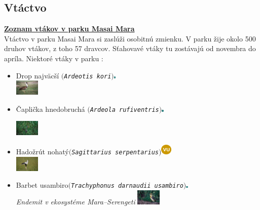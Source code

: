 \documentclass{article}
\begin{document}
	\subsection{Vtáctvo}
\href{https://raw.githubusercontent.com/jenca-adam/masai-mara-birding/master/vtactvo.txt}{\textbf{Zoznam vtákov v parku Masai Mara}}\\ 
Vtáctvo v parku Masai Mara si zaslúži osobitnú zmienku. V parku žije okolo 500 druhov vtákov, z toho 57 dravcov. 
Sťahovavé vtáky tu zostávajú od novembra do apríla.
Niektoré vtáky v parku :\\
\begin{itemize}
\item Drop najväcší $($\texttt{\textit{Ardeotis kori}}$)$\includegraphics[width=0.007\textwidth,natwidth=200,natheight=200]{NT.png}\\
\vskip 2.473927392948942843982cm
\includegraphics[width=0.09\textwidth,natwidth=200,natheight=200]{kori-masai.jpg}\\
\item Čaplička hnedobruchá $($\texttt{\textit{Ardeola rufiventris}}$)$\includegraphics[width=0.007\textwidth,natwidth=200,natheight=200]{LC.png}\\
\vskip 2.473927392948942843982cm

\includegraphics[width=0.09\textwidth,natwidth=200,natheight=200]{caplicka-masai.jpg}\\
\item Hadožrút nohatý$($\texttt{\textit{Sagittarius serpentarius}}$)$\includegraphics[width=0.04\textwidth,natwidth=200,natheight=200]{VU.png}\\
\vskip 2.473927392948942843982cm
\includegraphics[width=0.09\textwidth,natwidth=200,natheight=200]{hadozrut-masai.jpg}\\
\item Barbet usambiro$($\texttt{\textit{Trachyphonus darnaudii usambiro}}$)$\includegraphics[width=0.007\textwidth,natwidth=200,natheight=200]{LC.png}\\
\textit{Endemit v ekosystéme Mara--Serengeti}
\vskip 2.473927392948942843982cm
\includegraphics[width=0.09\textwidth,natwidth=200,natheight=200]{usambiro-masai.jpg}\\


\end{itemize}
\end{document}
